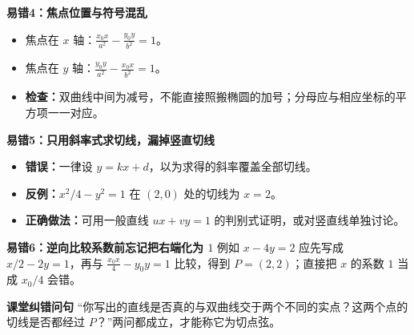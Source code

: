 \begin{trapbox}
\medskip
\begin{minipage}{\linewidth}
\textbf{\textcolor{CTrap}{易错4：焦点位置与符号混乱}}
\begin{itemize}[leftmargin=*,itemsep=0.25em]
\item 焦点在 $x$ 轴：$\frac{x_0x}{a^2}-\frac{y_0y}{b^2}=1$。
\item 焦点在 $y$ 轴：$\frac{y_0y}{a^2}-\frac{x_0x}{b^2}=1$。
\item \textbf{检查：}双曲线中间为减号，不能直接照搬椭圆的加号；分母应与相应坐标的平方项一一对应。
\end{itemize}\end{minipage}


\medskip
\begin{minipage}{\linewidth}
\textbf{\textcolor{CTrap}{易错5：只用斜率式求切线，漏掉竖直切线}}
\begin{itemize}[leftmargin=*,itemsep=0.25em]
\item \textbf{错误：}一律设 $y=kx+d$，以为求得的斜率覆盖全部切线。
\item \textbf{反例：}$x^2/4-y^2=1$ 在 $(2,0)$ 处的切线为 $x=2$。
\item \textbf{正确做法：}可用一般直线 $ux+vy=1$ 的判别式证明，或对竖直线单独讨论。
\end{itemize}\end{minipage}


\medskip
\textbf{\textcolor{CTrap}{易错6：逆向比较系数前忘记把右端化为 $1$}}
例如 $x-4y=2$ 应先写成 $x/2-2y=1$，再与 $\frac{x_0x}{4}-y_0y=1$ 比较，得到 $P=(2,2)$；直接把 $x$ 的系数 $1$ 当成 $x_0/4$ 会错。

\medskip
\textbf{\textcolor{CTrap}{课堂纠错问句}}
“你写出的直线是否真的与双曲线交于两个不同的实点？这两个点的切线是否都经过 $P$？”两问都成立，才能称它为切点弦。
\end{trapbox}
